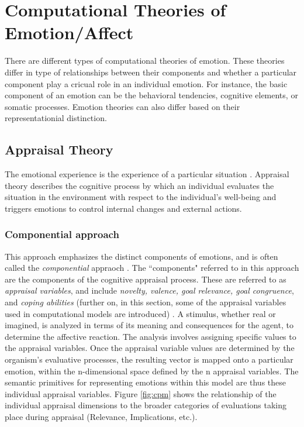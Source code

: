 \documentclass[11pt]{article}
\begin{document}
\section{Computational Theories of Emotion/Affect}

There are different types of computational theories of emotion. These theories
differ in type of relationships between their components and whether a
particular component play a cricual role in an individual emotion. For instance,
the basic component of an emotion can be the behavioral tendencies, cognitive
elements, or somatic processes. Emotion theories can also differ based on their
representationial distinction.

\subsection{Appraisal Theory}
\label{sec:appraisal-theory}

The emotional experience is the experience of a particular situation
\cite{frijda:emotions}. Appraisal theory describes the cognitive process by
which an individual evaluates the situation in the environment with respect to
the individual's well-being and triggers emotions to control internal changes
and external actions.

\subsubsection{Componential approach}
\label{sec:componential-theories}

This approach emphasizes the distinct components of emotions, and is often
called the \textit{componential} appraoch \cite{leventhal:emotion-cognition}.
The ``components" referred to in this approach are the components of the
cognitive appraisal process. These are referred to as \textit{appraisal
variables}, and include \textit{novelty, valence, goal relevance, goal
congruence}, and \textit{coping abilities}
(further on, in this section, some of the appraisal variables used in
computational models are introduced)
\cite{scherer:nature-function-emotion,scherer:appraisal-processes}. A stimulus,
whether real or imagined, is analyzed in terms of its meaning and consequences
for the agent, to determine the affective reaction. The analysis involves
assigning specific values to the appraisal variables. Once the appraisal
variable values are determined by the organism’s evaluative processes, the
resulting vector is mapped onto a particular emotion, within the n-dimensional
space defined by the n appraisal variables. The semantic primitives for
representing emotions within this model are thus these individual appraisal
variables. Figure \ref{fig:cpm} shows the relationship of the individual
appraisal dimensions to the broader categories of evaluations taking place
during appraisal (Relevance, Implications, etc.).
\end{document}
